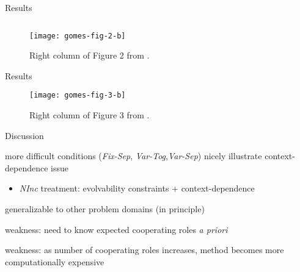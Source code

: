 \begin{frame}{Results}

\begin{figure}
\begin{columns}
\begin{column}{0.5\textwidth}
\texttt{[image: gomes-fig-2-b]}
\end{column}
\begin{column}{0.5\textwidth}
\caption{
Right column of Figure 2 from \cite{gomes2015cooperative}.
}
\end{column}
\end{columns}
\end{figure}

\end{frame}

\begin{frame}{Results}

\begin{figure}

\texttt{[image: gomes-fig-3-b]}

\caption{
Right column of Figure 3 from \cite{gomes2015cooperative}.
}

\end{figure}

\end{frame}

\begin{frame}{Discussion}

more difficult conditions (\textit{Fix-Sep}, \textit{Var-Tog},\textit{Var-Sep}) nicely illustrate context-dependence issue
\begin{itemize}
\item \textit{NInc} treatment: evolvability constraints + context-dependence
\end{itemize}

generalizable to other problem domains (in principle)

weakness: need to know expected cooperating roles \textit{a priori}

weakness: as number of cooperating roles increases, method becomes more computationally expensive

\end{frame}
